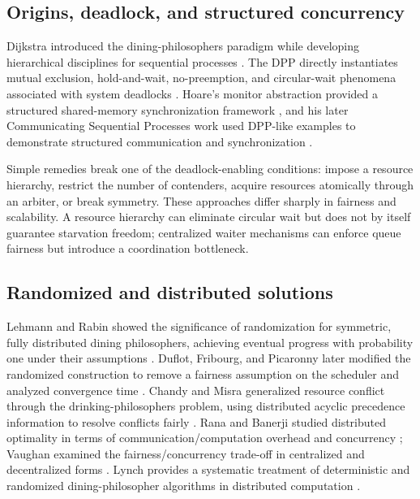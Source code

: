 \documentclass[10pt,journal]{IEEEtran}
\begin{document}
\subsection{Origins, deadlock, and structured concurrency}
Dijkstra introduced the dining-philosophers paradigm while developing hierarchical disciplines for sequential processes \cite{dijkstra1971}. The DPP directly instantiates mutual exclusion, hold-and-wait, no-preemption, and circular-wait phenomena associated with system deadlocks \cite{coffman1971}. Hoare's monitor abstraction provided a structured shared-memory synchronization framework \cite{hoare1974}, and his later Communicating Sequential Processes work used DPP-like examples to demonstrate structured communication and synchronization \cite{hoare1978}.

Simple remedies break one of the deadlock-enabling conditions: impose a resource hierarchy, restrict the number of contenders, acquire resources atomically through an arbiter, or break symmetry. These approaches differ sharply in fairness and scalability. A resource hierarchy can eliminate circular wait but does not by itself guarantee starvation freedom; centralized waiter mechanisms can enforce queue fairness but introduce a coordination bottleneck.

\subsection{Randomized and distributed solutions}
Lehmann and Rabin showed the significance of randomization for symmetric, fully distributed dining philosophers, achieving eventual progress with probability one under their assumptions \cite{lehmann1981}. Duflot, Fribourg, and Picaronny later modified the randomized construction to remove a fairness assumption on the scheduler and analyzed convergence time \cite{duflot2004}. Chandy and Misra generalized resource conflict through the drinking-philosophers problem, using distributed acyclic precedence information to resolve conflicts fairly \cite{chandy1984}. Rana and Banerji studied distributed optimality in terms of communication/computation overhead and concurrency \cite{rana1986}; Vaughan examined the fairness/concurrency trade-off in centralized and decentralized forms \cite{vaughan1992}. Lynch provides a systematic treatment of deterministic and randomized dining-philosopher algorithms in distributed computation \cite{lynch1996}.
\end{document}
